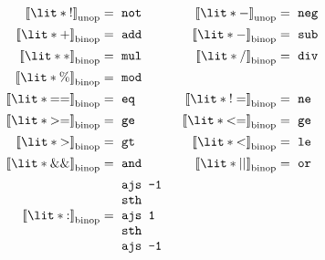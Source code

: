 \documentclass[english,10pt]{article} %
\makeatletter
\theoremstyle{definitionstyle}
\theoremstyle{lemmastyle}
\newenvironment{asmcode}{%
\begin{tabular}{%
>{\ttfamily}l>{\ttfamily}l}%
}{%
\end{tabular}%
}
\newcommand{\compile}[3]{{[\![ #3 ]\!]}^{#1}_{\text{\normalfont #2}}}
\newenvironment{Block}[1]{%
\begin{Warning}[singleextra={\path let \p1=(P), \p2=(O) in ($(\x2,0)+0.5*(0,\y1)$) node[mdframeleftlinetitle] {#1};}]%
}{%
\end{Warning}%
}
\makeatother
\begin{document}
\begin{Block}{Operations}

\begin{align*}
  \compile{}{unop}{\lit*{!}} = & \begin{asmcode}not\end{asmcode}
& \compile{}{unop}{\lit*{-}} = & \begin{asmcode}neg\end{asmcode}
%
\\\compile{}{binop}{\lit*{+}} = & \begin{asmcode}add\end{asmcode}
& \compile{}{binop}{\lit*{-}} = & \begin{asmcode}sub\end{asmcode}
\\\compile{}{binop}{\lit*{*}} = & \begin{asmcode}mul\end{asmcode}
& \compile{}{binop}{\lit*{/}} = & \begin{asmcode}div\end{asmcode}
\\\compile{}{binop}{\lit*{\%}} = & \begin{asmcode}mod\end{asmcode}
%
\\\compile{}{binop}{\lit*{==}} = & \begin{asmcode}eq\end{asmcode}
& \compile{}{binop}{\lit*{!=}} = & \begin{asmcode}ne\end{asmcode}
%
\\\compile{}{binop}{\lit*{>=}} = & \begin{asmcode}ge\end{asmcode}
& \compile{}{binop}{\lit*{<=}} = & \begin{asmcode}ge\end{asmcode}
\\\compile{}{binop}{\lit*{>}} = & \begin{asmcode}gt\end{asmcode}
& \compile{}{binop}{\lit*{<}} = & \begin{asmcode}le\end{asmcode}
%
\\\compile{}{binop}{\lit*{\&\&}} = & \begin{asmcode}and\end{asmcode}
& \compile{}{binop}{\lit*{||}} = & \begin{asmcode}or\end{asmcode}
%
\\\compile{}{binop}{\lit*{:}} = & \begin{asmcode}
ajs -1 \\
sth \\
ajs 1 \\
sth \\
ajs -1
\end{asmcode}
\end{align*}

\end{Block}
\end{document}
